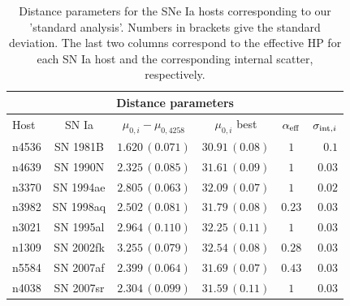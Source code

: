 \begin{table}[tbp]
\centering
\begin{tabular}{@{}lccccr}
\hline
\multicolumn{6}{c}{Distance parameters} \\
\hline
Host & SN Ia & $\mu_{0,i}-\mu_{0,4258}$ & $\mu_{0,i} $ best & $\alpha_{\mathrm{eff}}$ & $\sigma_{\mathrm{int},i}$\\
\hline

 n4536 & SN 1981B & $1.620\,(0.071)$&$30.91\,(0.08)$ &$1$ & $0.1$ \\

 n4639 & SN 1990N & $2.325\,(0.085)$& $31.61\,(0.09)$& $1 $ & $0.03$\\

 n3370 & SN 1994ae & $2.805\,(0.063)$& $32.09\,(0.07)$& $1 $ & $0.02$ \\
 
 n3982 & SN 1998aq & $2.502\,(0.081)$& $31.79\,(0.08)$& $ 0.23$ & $0.03$\\
  
 n3021 & SN 1995al & $2.964\,(0.110)$& $32.25\,(0.11)$& $ 1$ & $0.03$\\
    
 n1309 & SN 2002fk & $3.255\,(0.079)$& $32.54\,(0.08)$& $ 0.28$ & $0.03$\\

 n5584 & SN 2007af & $2.399\,(0.064)$& $31.69\,(0.07)$& $ 0.43$ & $0.03$\\
       
 n4038 & SN 2007sr & $2.304\,(0.099)$& $31.59\,(0.11)$& $ 1$ & $0.03$\\
       
\hline
\end{tabular}
\caption{\label{Table:SNIa-HP-fit-M1a} Distance parameters for the SNe Ia hosts corresponding to our 'standard analysis'. Numbers in brackets give the standard deviation. The last two columns correspond to the effective HP for each SN Ia host and the corresponding internal scatter, respectively.}
\end{table}

